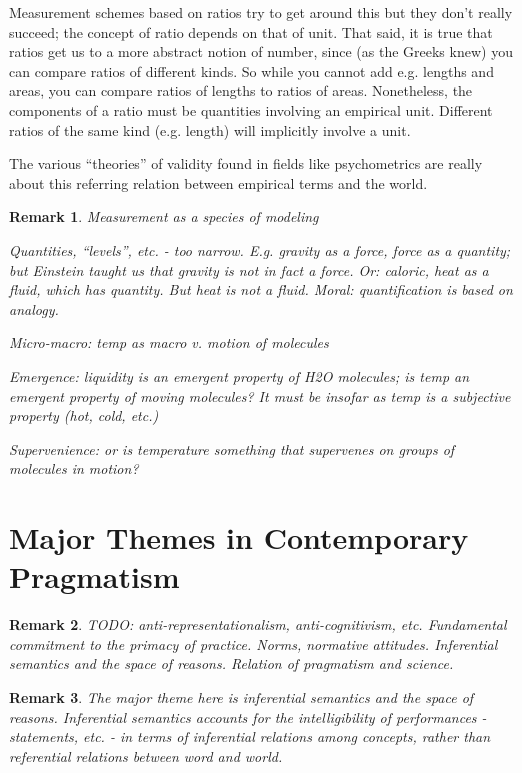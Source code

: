 \documentclass[11pt,twoside]{article}
\newtheorem{remark}{Remark}
\begin{document}
Measurement schemes based on ratios try to get around this but they
don't really succeed; the concept of ratio depends on that of unit.
That said, it is true that ratios get us to a more abstract notion of
number, since (as the Greeks knew) you can compare ratios of different
kinds.  So while you cannot add e.g. lengths and areas, you can
compare ratios of lengths to ratios of areas.  Nonetheless, the
components of a ratio must be quantities involving an empirical unit.
Different ratios of the same kind (e.g. length) will implicitly
involve a unit.

The various ``theories'' of validity found in fields like
psychometrics are really about this referring relation between
empirical terms and the world.  

\begin{remark}

Measurement as a species of modeling

Quantities, ``levels'', etc. - too narrow.  E.g. gravity as a force,
force as a quantity; but Einstein taught us that gravity is not in
fact a force.  Or: caloric, heat as a fluid, which has quantity.  But
heat is not a fluid. Moral: quantification is based on analogy.

Micro-macro:  temp as macro v. motion of molecules

Emergence: liquidity is an emergent property of H2O molecules; is temp
an emergent property of moving molecules?  It must be insofar as temp
is a subjective property (hot, cold, etc.)

Supervenience: or is temperature something that supervenes on groups
of molecules in motion?

\end{remark}



\section{Major Themes in Contemporary Pragmatism}

\begin{remark}
  TODO: anti-representationalism, anti-cognitivism, etc.  Fundamental
  commitment to the primacy of practice.  Norms, normative attitudes.
  Inferential semantics and the space of reasons.  Relation of
  pragmatism and science.
\end{remark}

\begin{remark}
  The major theme here is inferential semantics and the space of
  reasons.  Inferential semantics accounts for the intelligibility of
  performances - statements, etc. - in terms of inferential relations
  among concepts, rather than referential relations between word and
  world.
\end{remark}
\end{document}
